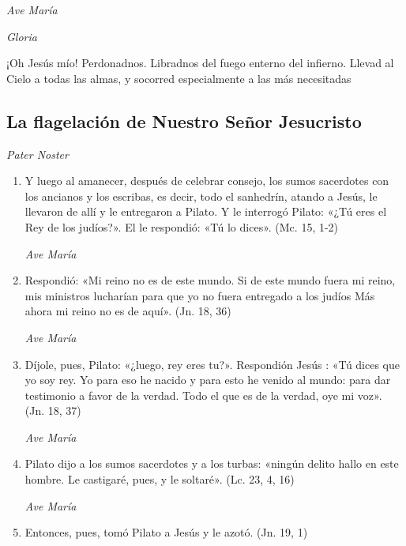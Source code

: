 \documentclass[a4paper,11pt, oneside]{report}
\begin{document}
        \textit{Ave María} \par
        \indent\textit{Gloria} \par
        \indent¡Oh Jesús mío! Perdonadnos. Libradnos del fuego enterno del infierno. Llevad al Cielo a todas las almas, y socorred especialmente a las más 
        necesitadas

      \subsection*{La flagelación de Nuestro Señor Jesucristo}
      
        \textit{Pater Noster}

        \begin{enumerate}
          
          \item Y luego al amanecer, después de celebrar consejo, los sumos sacerdotes con los ancianos y los escribas, es decir, todo el sanhedrín, atando a Jesús,
          le llevaron de allí y le entregaron a Pilato. Y le interrogó Pilato: «¿Tú eres el Rey de los judíos?». El le respondió: «Tú lo dices». (Mc. 15, 1-2)

          \textit{Ave María}

          \item Respondió: «Mi reino no es de este mundo. Si de este mundo fuera mi reino, mis ministros lucharían para que yo no fuera entregado a los judíos
          Más ahora mi reino no es de aquí». (Jn. 18, 36)

          \textit{Ave María}

          \item Díjole, pues, Pilato: «¿luego, rey eres tu?». Respondión Jesús : «Tú dices que yo soy rey. Yo para eso he nacido y para esto he venido
          al mundo: para dar testimonio a favor de la verdad. Todo el que es de la verdad, oye mi voz». (Jn. 18, 37)

          \textit{Ave María}

          \item Pilato dijo a los sumos sacerdotes y a los turbas: «ningún delito hallo en este hombre. 
          Le castigaré, pues, y le soltaré». (Lc. 23, 4, 16)

          \textit{Ave María}

          \item Entonces, pues, tomó Pilato a Jesús y le azotó. (Jn. 19, 1)


\end{enumerate}
\end{document}
